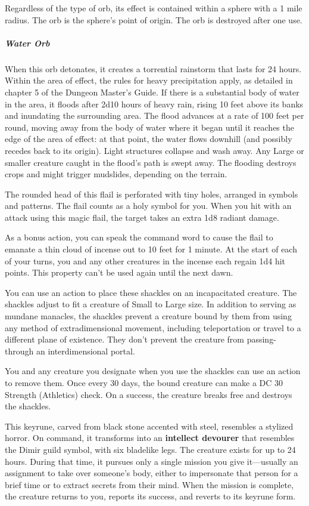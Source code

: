 \documentclass[10pt,a4paper,twoside,bg=print,twocolumn,openany,nodeprecatedcode]{dndbook}
\begin{document}
Regardless of the type of orb, its effect is contained within a sphere with a 1 mile radius. The orb is the sphere's point of origin. The orb is destroyed after one use.

\subparagraph{Water Orb}
When this orb detonates, it creates a torrential rainstorm that lasts for 24 hours. Within the area of effect, the rules for heavy precipitation apply, as detailed in chapter 5 of the Dungeon Master's Guide. If there is a substantial body of water in the area, it floods after 2d10 hours of heavy rain, rising 10 feet above its banks and inundating the surrounding area. The flood advances at a rate of 100 feet per round, moving away from the body of water where it began until it reaches the edge of the area of effect: at that point, the water flows downhill (and possibly recedes back to its origin). Light structures collapse and wash away. Any Large or smaller creature caught in the flood's path is swept away. The flooding destroys crops and might trigger mudslides, depending on the terrain.

The rounded head of this flail is perforated with tiny holes, arranged in symbols and patterns. The flail counts as a holy symbol for you. When you hit with an attack using this magic flail, the target takes an extra 1d8 radiant damage.

As a bonus action, you can speak the command word to cause the flail to emanate a thin cloud of incense out to 10 feet for 1 minute. At the start of each of your turns, you and any other creatures in the incense each regain 1d4 hit points. This property can't be used again until the next dawn.

You can use an action to place these shackles on an incapacitated creature. The shackles adjust to fit a creature of Small to Large size. In addition to serving as mundane manacles, the shackles prevent a creature bound by them from using any method of extradimensional movement, including teleportation or travel to a different plane of existence. They don't prevent the creature from passing-through an interdimensional portal.

You and any creature you designate when you use the shackles can use an action to remove them. Once every 30 days, the bound creature can make a DC 30 Strength (Athletics) check. On a success, the creature breaks free and destroys the shackles.

This keyrune, carved from black stone accented with steel, resembles a stylized horror. On command, it transforms into an \textbf{intellect devourer} that resembles the Dimir guild symbol, with six bladelike legs. The creature exists for up to 24 hours. During that time, it pursues only a single mission you give it—usually an assignment to take over someone's body, either to impersonate that person for a brief time or to extract secrets from their mind. When the mission is complete, the creature returns to you, reports its success, and reverts to its keyrune form.
\end{document}

